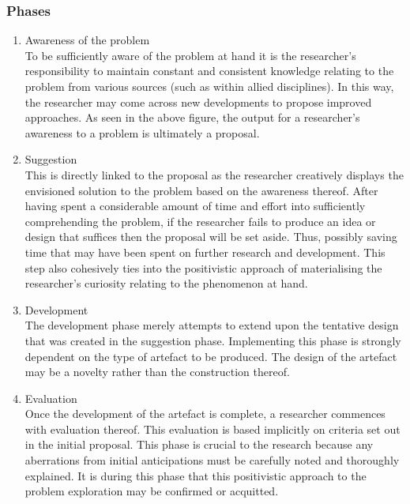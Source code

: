 \subsubsection{Phases}
\begin{enumerate}[label=\roman*.]
	\item Awareness of the problem\\\vspace{4mm}
	To be sufficiently aware of the problem at hand it is the researcher’s responsibility to maintain constant and consistent knowledge relating to the problem from various sources (such as within allied disciplines). In this way, the researcher may come across new developments to propose improved approaches. As seen in the above figure, the output for a researcher’s awareness to a problem is ultimately a proposal.
	
	\item Suggestion \\\vspace{4mm}
	This is directly linked to the proposal as the researcher creatively displays the envisioned solution to the problem based on the awareness thereof. After having spent a considerable amount of time and effort into sufficiently comprehending the problem, if the researcher fails to produce an idea or design that suffices then the proposal will be set aside. Thus, possibly saving time that may have been spent on further research and development.
This step also cohesively ties into the positivistic approach of materialising the researcher’s curiosity relating to the phenomenon at hand.

	\item Development \\\vspace{4mm}
	The development phase merely attempts to extend upon the tentative design that was created in the suggestion phase. Implementing this phase is strongly dependent on the type of artefact to be produced. The design of the artefact may be a novelty rather than the construction thereof.
	
	\item Evaluation \\\vspace{4mm}
	Once the development of the artefact is complete, a researcher commences with evaluation thereof. This evaluation is based implicitly on criteria set out in the initial proposal. This phase is crucial to the research because any aberrations from initial anticipations must be carefully noted and thoroughly explained. It is during this phase that this positivistic approach to the problem exploration may be confirmed or acquitted. 
	

\end{enumerate}
